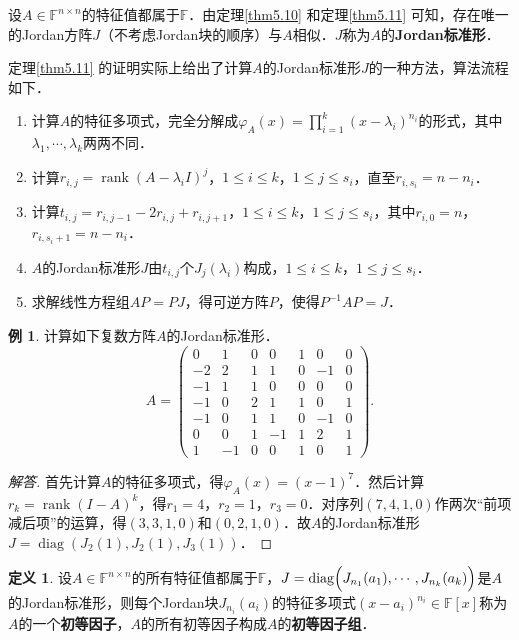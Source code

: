 \documentclass[a4paper,fontset=windows]{ctexbook}
\theoremstyle{definition}
\newtheorem{definition}{定义}[chapter]
\newtheorem{example}{例}[chapter]
\DeclareMathOperator{\diag}{diag}
\DeclareMathOperator{\rank}{rank}
\renewcommand{\le}{\leqslant}
\begin{document}
设$A\in\mathbb{F}^{n\times n}$的特征值都属于$\mathbb{F}$．由定理\ref{thm5.10} 和定理\ref{thm5.11} 可知，存在唯一的Jordan方阵$J$（不考虑Jordan块的顺序）与$A$相似．$J$称为$A$的{\bf Jordan标准形}．

\medskip 定理\ref{thm5.11} 的证明实际上给出了计算$A$的Jordan标准形$J$的一种方法，算法流程如下．
\begin{enumerate}
\item 计算$A$的特征多项式，完全分解成$\varphi_A(x)=\prod\limits_{i=1}^k(x-\lambda_i)^{n_i}$的形式，其中$\lambda_1,\cdots,\lambda_k$两两不同．

\item 计算$r_{i,j}=\rank(A-\lambda_iI)^j$，$1\le i\le k$，$1\le j\le s_i$，直至$r_{i,s_i}=n-n_i$．

\item 计算$t_{i,j}=r_{i,j-1}-2r_{i,j}+r_{i,j+1}$，$1\le i\le k$，$1\le j\le s_i$，其中$r_{i,0}=n$，$r_{i,s_i+1}=n-n_i$．

\item $A$的Jordan标准形$J$由$t_{i,j}$个$J_j(\lambda_i)$构成，$1\le i\le k$，$1\le j\le s_i$．

\item 求解线性方程组$AP=PJ$，得可逆方阵$P$，使得$P^{-1}AP=J$．
\end{enumerate}

\begin{example}
计算如下复数方阵$A$的Jordan标准形．
$$A=\begin{pmatrix}0&1&0&0&1&0&0 \\ -2&2&1&1&0&-1&0 \\ -1&1&1&0&0&0&0 \\ -1&0&2&1&1&0&1 \\ -1&0&1&1&0&-1&0 \\ 0&0&1&-1&1&2&1 \\ 1&-1&0&0&1&0&1\end{pmatrix}.$$
\end{example}

\begin{proof}[解答]
首先计算$A$的特征多项式，得$\varphi_A(x)=(x-1)^7$．然后计算$r_k=\rank(I-A)^k$，得$r_1=4$，$r_2=1$，$r_3=0$．对序列$(7,4,1,0)$作两次“前项减后项”的运算，得$(3,3,1,0)$和$(0,2,1,0)$．故$A$的Jordan标准形$J=\diag(J_2(1),J_2(1),J_3(1))$．
\end{proof}

\begin{definition}
设$A\in\mathbb{F}^{n\times n}$的所有特征值都属于$\mathbb{F}$，$J=\diag\Bigl(J_{n_1}(a_1),\cdots,J_{n_k}(a_k)\Bigr)$是$A$的Jordan标准形，则每个Jordan块$J_{n_i}(a_i)$的特征多项式$(x-a_i)^{n_i}\in\mathbb{F}[x]$称为$A$的一个{\bf 初等因子}，$A$的所有初等因子构成$A$的{\bf 初等因子组}．
\end{definition}
\end{document}
